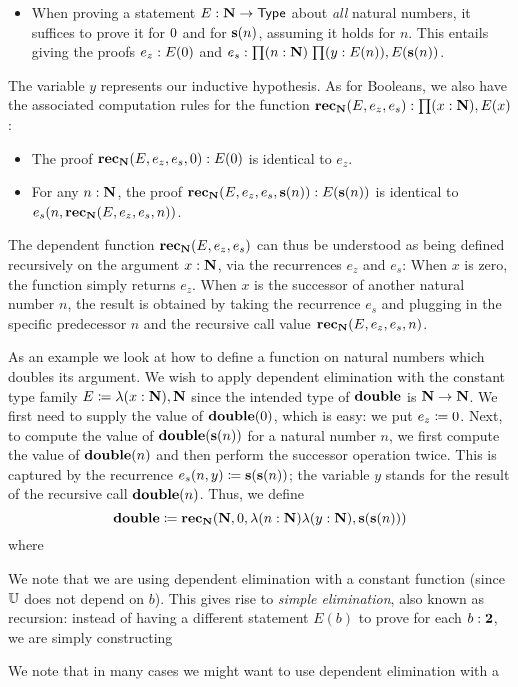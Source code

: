 \begin{itemize}
\item When proving a statement $E : \mathbf{N} \to \mathsf{Type}$ about \emph{all} natural numbers, it suffices to prove it for $0$ and for $\mathbf{s}(n)$, assuming it holds
for $n$. This entails giving the proofs $e_z : E(0)$ and $e_s : \prd{n : \nat}{y : E(n)} E(\s(n))$.
\end{itemize}
The variable $y$ represents our inductive hypothesis. As for Booleans, we also have the associated computation rules for the function $\rec_\nat(E,e_z,e_s) : \prd{x:\nat} E(x)$:
\begin{itemize}
\item The proof $\mathbf{rec}_\mathbf{N}(E,e_z,e_s,0) : E(0)$ is identical to $e_z$.
\item For any $n : \mathbf{N}$, the proof $\mathbf{rec}_\mathbf{N}(E,e_z,e_s,\mathbf{s}(n)) : E(\mathbf{s}(n))$ is identical to $e_s(n,\mathbf{rec}_\mathbf{N}(E,e_z,e_s,n))$.
\end{itemize}
The dependent function $\mathbf{rec}_\mathbf{N}(E,e_z,e_s)$ can thus be understood as being defined recursively on the argument $x : \mathbf{N}$, via the recurrences $e_z$ and $e_s$: When $x$ is zero, the function simply returns $e_z$. When $x$ is the successor of another natural number $n$, the result is obtained by taking the recurrence $e_s$ and plugging in the specific predecessor $n$ and the recursive call value $\mathbf{rec}_\mathbf{N}(E,e_z,e_s,n)$.

As an example we look at how to define a function on natural numbers which doubles its argument. We wish to apply dependent elimination with the constant type family $E \coloneqq \lambda(x : \mathbf{N}), \mathbf{N}$ since the intended type of $\mathbf{double}$ is $\mathbf{N} \to \mathbf{N}$. We first need to supply the value of $\mathbf{double}(0)$, which is easy: we put $e_z \coloneqq 0$. Next, to compute the value of $\mathbf{double}(\mathbf{s}(n))$ for a natural number $n$, we first compute the value of $\mathbf{double}(n)$ and then perform the successor operation twice. This is captured by the recurrence $e_s(n,y) \coloneqq \mathbf{s}(\mathbf{s}(n))$; the variable $y$ stands for the result of the recursive call $\mathbf{double}(n)$. Thus, we define
\[ \mathbf{double} \coloneqq \mathbf{rec}_\mathbf{N}(\mathbf{N}, 0, \lambda(n: \mathbf{N}) \lambda (y:\mathbf{N}), \mathbf{s}(\mathbf{s}(n))) \]
where 



We note that we are using dependent elimination with a constant function (since $\mathbb{U}$ does not depend on $b$). This gives rise to \emph{simple elimination}, also known as recursion: instead of having a different statement $E(b)$ to prove for each $b : \mathbf{2}$, we are simply constructing 

We note that in many cases we might want to use dependent elimination with a 

